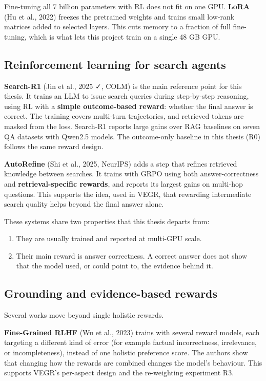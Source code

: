 Fine-tuning all 7 billion parameters with RL does not fit on one GPU.
\textbf{LoRA} (Hu et al., 2022) freezes the pretrained weights and
trains small low-rank matrices added to selected layers. This cuts
memory to a fraction of full fine-tuning, which is what lets this
project train on a single 48 GB GPU.

\subsection{Reinforcement learning for search agents}\label{sec:2.6}

\textbf{Search-R1} (Jin et al., 2025 ✓, COLM) is the main reference
point for this thesis. It trains an LLM to issue search queries during
step-by-step reasoning, using RL with a \textbf{simple outcome-based
reward}: whether the final answer is correct. The training covers
multi-turn trajectories, and retrieved tokens are masked from the loss.
Search-R1 reports large gains over RAG baselines on seven QA datasets
with Qwen2.5 models. The outcome-only baseline in this thesis (R0)
follows the same reward design.

\textbf{AutoRefine} (Shi et al., 2025, NeurIPS) adds a step that refines
retrieved knowledge between searches. It trains with GRPO using both
answer-correctness and \textbf{retrieval-specific rewards}, and reports
its largest gains on multi-hop questions. This supports the idea, used
in VEGR, that rewarding intermediate search quality helps beyond the
final answer alone.

These systems share two properties that this thesis departs from:

\begin{enumerate}
\def\labelenumi{\arabic{enumi}.}
\tightlist
\item
  They are usually trained and reported at multi-GPU scale.
\item
  Their main reward is answer correctness. A correct answer does not
  show that the model used, or could point to, the evidence behind it.
\end{enumerate}

\subsection{Grounding and evidence-based rewards}\label{sec:2.7}

Several works move beyond single holistic rewards.

\textbf{Fine-Grained RLHF} (Wu et al., 2023) trains with several reward
models, each targeting a different kind of error (for example factual
incorrectness, irrelevance, or incompleteness), instead of one holistic
preference score. The authors show that changing how the rewards are
combined changes the model's behaviour. This supports VEGR's per-aspect
design and the re-weighting experiment R3.

